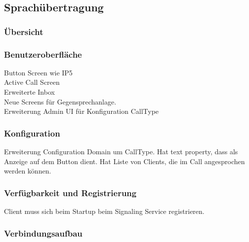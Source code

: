 \subsection{Sprachübertragung}

\subsubsection*{Übersicht}



\subsubsection*{Benutzeroberfläche}

Button Screen wie IP5 \\
Active Call Screen \\
Erweiterte Inbox \\
Neue Screens für Gegensprechanlage. \\
Erweiterung Admin UI für Konfiguration CallType \\


\subsubsection*{Konfiguration}
Erweiterung Configuration Domain um CallType.
Hat text property, dass als Anzeige auf dem Button dient.
Hat Liste von Clients, die im Call angesprochen werden können.


\subsubsection*{Verfügbarkeit und Registrierung}

Client muss sich beim Startup beim Signaling Service registrieren.

\clearpage

\subsubsection*{Verbindungsaufbau}

